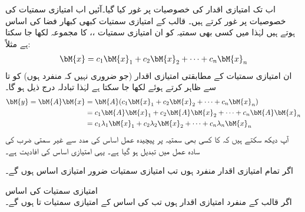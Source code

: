 اب تک امتیازی اقدار کی خصوصیات پر غور کیا گیا۔آئیں اب امتیازی سمتیات کی خصوصیات پر غور کرتے ہیں۔ قالب  کے امتیازی سمتیات  کبھی  کبھار فضا  کی اساس ہوتے ہیں لہٰذا  میں کسی بھی سمتیہ  کو ان امتیازی سمتیات ،،  کا مجموعہ لکھا جا سکتا ہے مثلاً:
\begin{align}
\bM{x}=c_1\bM{x}_1+c_2\bM{x}_2+\cdots+c_n\bM{x}_n
\end{align}
ان امتیازی سمتیات کے مطابقتی امتیازی اقدار (جو ضروری نہیں کہ منفرد ہوں) کو  تا  سے ظاہر کرتے ہوئے
  لکھا جا سکتا ہے لہٰذا تبادلہ  درج ذیل ہو گا۔
\begin{gather}
\begin{aligned}
\bM{y}=\bM{A}\bM{x}&=\bM{A}(c_1\bM{x}_1+c_2\bM{x}_2+\cdots+c_n\bM{x}_n)\\
&=c_1\bM{A}\bM{x}_1+c_2\bM{A}\bM{x}_2+\cdots+c_n\bM{A}\bM{x}_n\\
&=c_1\lambda_1\bM{x}_1+c_2\lambda_2\bM{x}_2+\cdots+c_n\lambda_n\bM{x}_n
\end{aligned}
\end{gather}
آپ دیکھ سکتے ہیں کہ  کا کسی بھی سمتیہ  پر پیچیدہ عمل اساس کی مدد سے  غیر سمتی ضرب کی سادہ عمل میں تبدیل ہو گیا ہے۔ یہی امتیازی اساس کی افادیت ہے۔

اگر تمام امتیازی اقدار منفرد  ہوں تب امتیازی سمتیات ضرور امتیازی اساس ہوں گے۔

\quad امتیازی سمتیات کی اساس\\
اگر  قالب  کے  منفرد امتیازی اقدار ہوں تب  کی اساس  کے امتیازی سمتیات  تا  ہوں گے۔

